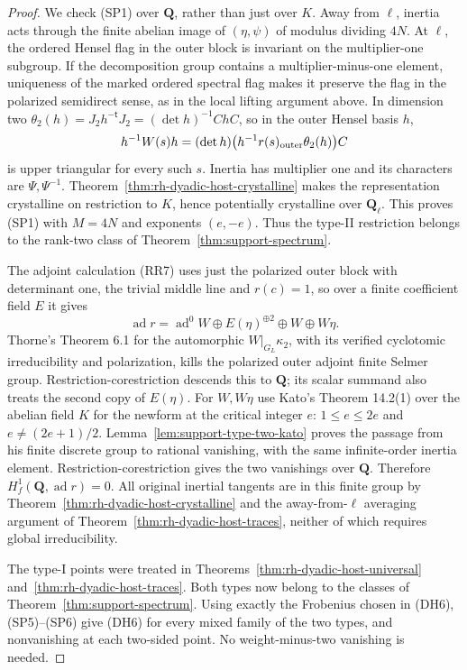 \begin{proof}
We check (SP1) over $\mathbf Q$, rather than just over
$K$. Away from $\ell$, inertia acts through the finite
abelian image of $(\eta,\psi)$ of modulus dividing $4N$.
At $\ell$, the ordered Hensel flag in the outer block is
invariant on the multiplier-one subgroup. If the
decomposition group contains a multiplier-minus-one
element, uniqueness of the marked ordered spectral flag
makes it preserve the flag in the polarized semidirect
sense, as in the local lifting argument above. In
dimension two
$\theta_2(h)=J_2h^{-\mathsf t}J_2=(\det h)^{-1}ChC$,
so in the outer Hensel basis $h$,
\[
 h^{-1}W(s)h=(\det h)
       \bigl(h^{-1}r(s)_{\rm outer}\theta_2(h)\bigr)C
\]
is upper triangular for every such $s$.
Inertia has multiplier one and its characters are
$\Psi,\Psi^{-1}$. Theorem~\ref{thm:rh-dyadic-host-crystalline}
makes the representation crystalline on restriction to
$K$, hence potentially crystalline over $\mathbf Q_\ell$.
This proves (SP1) with $M=4N$ and exponents $(e,-e)$.
Thus the type-II restriction belongs to the rank-two
class of Theorem~\ref{thm:support-spectrum}.

The adjoint calculation (RR7) uses just the polarized
outer block with determinant one, the trivial middle
line and $r(c)=1$, so over a finite coefficient field
$E$ it gives
\[
 \operatorname{ad}r=\operatorname{ad}^{0}W
          \oplus E(\eta)^{\oplus2}\oplus W\oplus W\eta .
\]
Thorne's Theorem 6.1 for the automorphic
$W|_{G_L}\kappa_2$, with its verified cyclotomic
irreducibility and polarization, kills the polarized
outer adjoint finite Selmer group. Restriction-corestriction
descends this to $\mathbf Q$; its scalar summand also
treats the second copy of $E(\eta)$.
For $W,W\eta$ use Kato's Theorem 14.2(1) over the
abelian field $K$ for the newform at the critical
integer $e$: $1\le e\le2e$ and $e\ne(2e+1)/2$.
Lemma~\ref{lem:support-type-two-kato} proves the
passage from his finite discrete group to rational
vanishing, with the same infinite-order inertia element.
Restriction-corestriction gives the two vanishings over
$\mathbf Q$. Therefore $H_f^1(\mathbf Q,\operatorname{ad}r)=0$.
All original inertial tangents are in this finite group
by Theorem~\ref{thm:rh-dyadic-host-crystalline} and the
away-from-$\ell$ averaging argument of
Theorem~\ref{thm:rh-dyadic-host-traces}, neither of which
requires global irreducibility.

The type-I points were treated in
Theorems~\ref{thm:rh-dyadic-host-universal}
and~\ref{thm:rh-dyadic-host-traces}. Both types now
belong to the classes of Theorem~\ref{thm:support-spectrum}.
Using exactly the Frobenius chosen in (DH6), (SP5)--(SP6)
give (DH6) for every mixed family of the two types,
and nonvanishing at each two-sided point.
No weight-minus-two vanishing is needed.


\end{proof}
